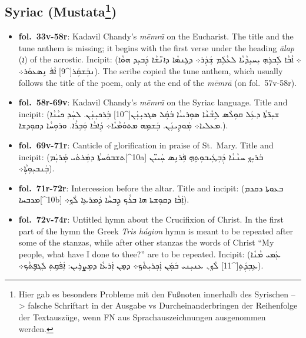 \documentclass[
  english,
  a4paper,
  DIV=12,
  footlines=2.1,
  usegeometry=true]{scrartcl}
\newcommand{\textsyriac}[2][]{\foreignlanguage{syriac}{#2}}
\begin{document}
\hypertarget{syriac-mustataprobleme}{%
\subsection[Syriac (Mustata)]{\texorpdfstring{Syriac
(Mustata\footnote{Hier gab es besonders Probleme mit den Fußnoten
  innerhalb des Syrischen --\textgreater{} falsche Schriftart in der
  Ausgabe vs Durcheinanderbringen der Reihenfolge der Textauszüge, wenn
  FN aus Sprachauszeichnungen ausgenommen werden.})}{Syriac (Mustata)}}\label{syriac-mustataprobleme}}

\begin{itemize}
\item
  \leavevmode\marginpar{\textcolor{parnum}{{[}8{]}}}\textbf{fol.~33v-58r}:
  Kadavil Chandy's \emph{mēmrā} on the Eucharist. The title and the tune
  anthem is missing; it begins with the first verse under the heading
  \emph{ālap} (\textsyriac{ܐ}) of the acrostic. Incipit: (\textsyriac{܀
  ܐܵܒܵܐ ܠܲܒܪܹܗ̣ ܝܼܚܝܼܕܵܝܵܐ ܠܥܵܠܲܡ ܫܲܕܲܪ܀ ܕܓܹܢܣܵܐ ܕܐܢ̈ܫܵܐ ܕܲܒܝܼܕ ܗܘܵܐ
  ܢܒܲܫܩܲܪ{[}\^{}9{]} ܐܵܦܿ ܢܹܣܥܘܿܪ܀}). The scribe copied the tune anthem,
  which usually follows the title of the poem, only at the end of the
  \emph{mēmrā} (on fol.~57v-58r).
\item
  \leavevmode\marginpar{\textcolor{parnum}{{[}9{]}}}\textbf{fol.~58r-69v}:
  Kadavil Chandy's \emph{mēmrā} on the Syriac language. Title and
  incipit: (\textsyriac{ܫܝܼܪ̈ܬܵܐ ܕܥܲܠ ܩܘܼܠܵܣ ܠܹܫܵܢܵܐ ܣܘܼܪܝܝܵܐ ܒܿܩܲܠ
  ܣܓܖܝܼܢܲܢ{[}\^{}10{]} ܒܲܪܟܝܼܢܲܢ. ܠܚܲܕ ܟܝܵܢܵܐ ܡܥܠܝܐ܀ ܡܲܘܕܹܝܢܲܢ. ܒܲܫܡܹܗ
  ܡܬܘܿܡܵܝܵܐ܀ ܕܲܐܒܵܐ ܘܲܒܼܪܵܐ. ܘܪܘܼܚܵܐ ܕܩܘܼܕܫܐ.}).
\item
  \leavevmode\marginpar{\textcolor{parnum}{{[}10{]}}}\textbf{fol.~69v-71r}:
  Canticle of glorification in praise of St.~Mary. Title and incipit:
  (\textsyriac{ܬܫܒܘܿܚܬܵܐ ܕܡܲܪܬܿܝ ܡܲܪܝܲܡ{[}\^{}10a{]} ܒܿܪܝܼܟܼ ܚܢܵܢܵܐ
  ܕܲܒܼܛܲܝܒܘܼܬܹܗ̣ ܦܲܪܢܹܣ ܚܲܝܝ̈ܢ ܒܲܢܒܝܼܘܼܬܼܵܐ܀}).
\item
  \leavevmode\marginpar{\textcolor{parnum}{{[}11{]}}}\textbf{fol.~71r-72r}:
  Intercession before the altar. Title and incipit: (\textsyriac{ܒܥܘܬܐ
  ܖܩܖܡ ܡܖܒܚܐ{[}\^{}10b{]} ܐܲܒܵܐ ܕܩܘܼܫܬܐ ܗܐ ܒܪܵܟ ܕܹܒܚܵܐ ܕܲܡܪܥܹܐ ܠܵܟܼ܀}).
\item
  \leavevmode\marginpar{\textcolor{parnum}{{[}12{]}}}\textbf{fol.~72v-74r}:
  Untitled hymn about the Crucifixion of Christ. In the first part of
  the hymn the Greek \emph{Trìs hágion} hymn is meant to be repeated
  after some of the stanzas, while after other stanzas the words of
  Christ ``My people, what have I done to thee?'' are to be repeated.
  Incipit: (\textsyriac{ܥܲܡܝ ܡܵܢܵܐ ܥܹܒܼܕܲܬܼ{[}\^{}11{]} ܠܵܟܼ܆ ܥܢܝܼܢܝ
  ܒܿܡܲܢ ܐܲܟܼܪܝܼܬܵܟܼ܀ ܕܡ̣ܢ ܐܲܪܥܵܐ ܕܡܹܨܪܹܝܢ: ܐܲܦܿܩܹܬܼ ܠܲܓܦܹܬܵܟ܀}).
\end{itemize}
\end{document}
